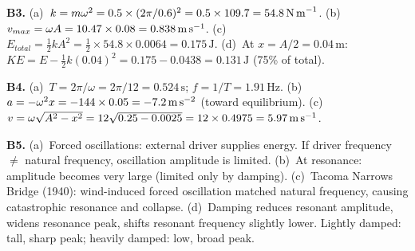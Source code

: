 \textbf{B3.}
(a)~$k=m\omega^2=0.5\times(2\pi/0.6)^2=0.5\times109.7
=54.8\,\text{N\,m}^{-1}$. \quad
(b)~$v_{max}=\omega A=10.47\times0.08=0.838\,\text{m\,s}^{-1}$. \quad
(c)~$E_{total}=\tfrac{1}{2}kA^2=\tfrac{1}{2}\times54.8
\times0.0064=0.175\,\text{J}$. \quad
(d)~At $x=A/2=0.04\,\text{m}$:
$KE=E-\tfrac{1}{2}k(0.04)^2=0.175-0.0438=0.131\,\text{J}$
(75\% of total).

\textbf{B4.}
(a)~$T=2\pi/\omega=2\pi/12=0.524\,\text{s}$;
$f=1/T=1.91\,\text{Hz}$. \quad
(b)~$a=-\omega^2 x=-144\times0.05=-7.2\,\text{m\,s}^{-2}$
(toward equilibrium). \quad
(c)~$v=\omega\sqrt{A^2-x^2}=12\sqrt{0.25-0.0025}
=12\times0.4975=5.97\,\text{m\,s}^{-1}$.

\textbf{B5.}
(a)~Forced oscillations: external driver supplies energy.
If driver frequency $\neq$ natural frequency, oscillation
amplitude is limited. \quad
(b)~At resonance: amplitude becomes very large (limited
only by damping). \quad
(c)~Tacoma Narrows Bridge (1940): wind-induced forced
oscillation matched natural frequency, causing
catastrophic resonance and collapse. \quad
(d)~Damping reduces resonant amplitude, widens resonance
peak, shifts resonant frequency slightly lower.
Lightly damped: tall, sharp peak; heavily damped: low,
broad peak.

\endgroup


